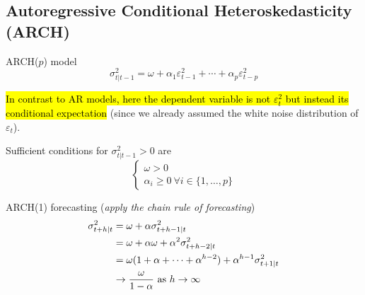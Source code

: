 \documentclass[11pt]{article}
\begin{document}
	    \subsection{Autoregressive Conditional Heteroskedasticity (ARCH)}
            \begin{definition}
                ARCH($p$) model
                \begin{equation}
                    \sigma_{t|t-1}^2 = \omega + \alpha_1 \varepsilon_{t-1}^2 + \cdots + \alpha_p \varepsilon_{t-p}^2
                \end{equation}
            \end{definition}
            
            \begin{remark}
                \hl{In contrast to AR models, here the dependent variable is not $\varepsilon_t^2$ but instead its conditional expectation} (since we already assumed the white noise distribution of $\varepsilon_t$).
            \end{remark}
            
            \begin{remark}
                Sufficient conditions for $\sigma_{t|t-1}^2 > 0$ are 
                \begin{equation}
                    \begin{cases}
                        \omega > 0 \\
                        \alpha_i \geq 0\ \forall i \in \{1, \dots, p\}
                    \end{cases}
                \end{equation}
            \end{remark}
            
            \begin{remark}
                ARCH(1) forecasting (\emph{apply the chain rule of forecasting})
                \begin{align}
                    \sigma_{t+h|t}^2 &= \omega + \alpha \sigma_{t+h-1|t}^2 \\
                    &= \omega + \alpha \omega + \alpha^2 \sigma_{t+h-2|t}^2 \\
                    &= \omega(1 + \alpha + \dots + \alpha^{h-2}) + \alpha^{h-1} \sigma_{t+1|t}^2 \\
                    &\to \frac{\omega}{1 - \alpha} \text{{ as }} h \to \infty
                \end{align}
            \end{remark}
\end{document}
